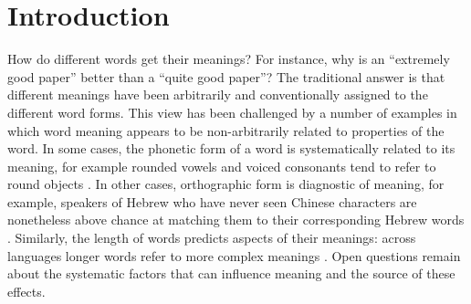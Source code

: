 \section{Introduction}

How do different words get their meanings?
For instance, why is an ``extremely good paper'' better than a ``quite good paper''?
The traditional answer \cite{de_saussure_nature_1916} is that different meanings have been arbitrarily and conventionally assigned to the different word forms.
This view has been challenged by a number of examples in which word meaning appears to be non-arbitrarily related to properties of the word.
In some cases, the phonetic form of a word is systematically related to its meaning, for example rounded vowels and voiced consonants tend to refer to round objects \cite{kohler_gestalt_1970, ramachandran_synaesthesiawindow_2001, holland_physiognomic_1964, davis_fitness_1961}.
In other cases, orthographic form is diagnostic of meaning, for example, speakers of Hebrew who have never seen Chinese characters are nonetheless above chance at matching them to their corresponding Hebrew words \cite{koriat_figural_1979}.
Similarly, the length of words predicts aspects of their meanings: across languages longer words refer to more complex meanings \cite{lewis_conceptual_2016}.
Open questions remain about the systematic factors that can influence meaning and the source of these effects.


